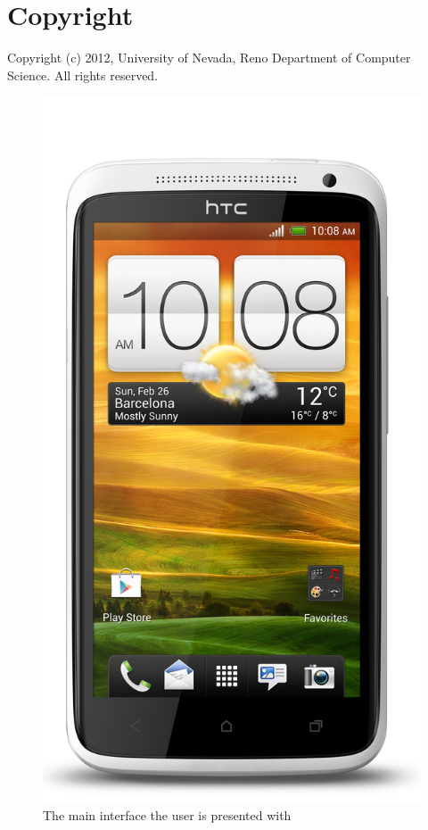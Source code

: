 \documentclass{chi-ext}
\begin{document}
\section{Copyright}
Copyright (c) 2012, University of Nevada, Reno Department of Computer Science.
All rights reserved.

\pagebreak

\begin{figure}
\parbox{1\columnwidth}{

  \centering
  \includegraphics[width=0.8\columnwidth]{onex.jpg}
  \caption{The main interface the user is presented with}
  \label{fig:maininterface}
}
\end{figure}
\end{document}
